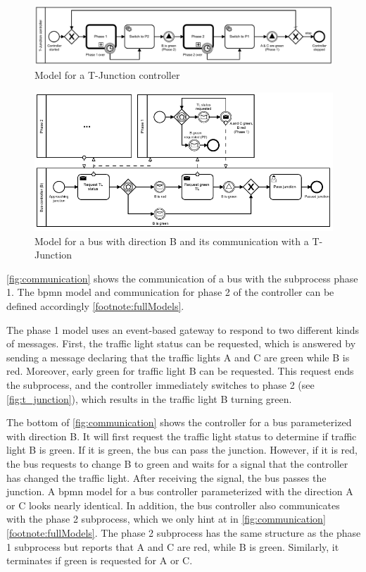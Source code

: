 \documentclass{jot}
\begin{document}
\begin{figure}[h]
    \centering
    \includegraphics[width=1\textwidth]{figures/t-junction.pdf}
    \caption{Model for a T-Junction controller}
    \label{fig:t_junction}
\end{figure}

\begin{figure}[ht]
    \centering
    \includegraphics[width=1\textwidth]{figures/communication.pdf}
    \caption{Model for a bus with direction B and its communication with a T-Junction}
    \label{fig:communication}
\end{figure}

\autoref{fig:communication} shows the communication of a bus with the subprocess phase 1.
The \gls*{bpmn} model and communication for phase 2 of the controller can be defined accordingly \cref{footnote:fullModels}.

The phase 1 model uses an event-based gateway to respond to two different kinds of messages.
First, the traffic light status can be requested, which is answered by sending a message declaring that the traffic lights A and C are green while B is red.
Moreover, early green for traffic light B can be requested.
This request ends the subprocess, and the controller immediately switches to phase 2 (see \autoref{fig:t_junction}), which results in the traffic light B turning green.

The bottom of \autoref{fig:communication} shows the controller for a bus parameterized with direction B.
It will first request the traffic light status to determine if traffic light B is green.
If it is green, the bus can pass the junction.
However, if it is red, the bus requests to change B to green and waits for a signal that the controller has changed the traffic light.
After receiving the signal, the bus passes the junction.
A \gls*{bpmn} model for a bus controller parameterized with the direction A or C looks nearly identical.
In addition, the bus controller also communicates with the phase 2 subprocess, which we only hint at in \autoref{fig:communication}\cref{footnote:fullModels}.
The phase 2 subprocess has the same structure as the phase 1 subprocess but reports that A and C are red, while B is green.
Similarly, it terminates if green is requested for A or C.
\end{document}
